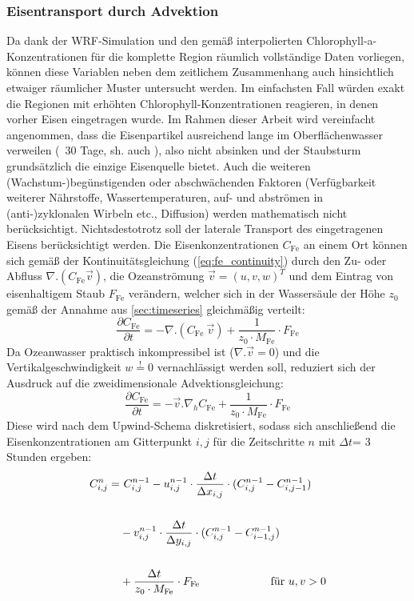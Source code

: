 \documentclass[12pt,a4paper,onecolumn]{scrartcl}
\begin{document}
\subsubsection{Eisentransport durch Advektion} \label{sec:methods_advection}
Da dank der WRF-Simulation und den gemäß \citet{Saulquin.2019} interpolierten Chlorophyll-a-Konzentrationen für die komplette Region räumlich vollständige Daten vorliegen, können diese Variablen neben dem zeitlichem Zusammenhang auch hinsichtlich etwaiger räumlicher Muster untersucht werden. Im einfachsten Fall würden exakt die Regionen mit erhöhten Chlorophyll-Konzentrationen reagieren, in denen vorher Eisen eingetragen wurde. Im Rahmen dieser Arbeit wird vereinfacht angenommen, dass die Eisenpartikel ausreichend lange im Oberflächenwasser verweilen (~30 Tage, sh. auch \citet{Cropp.2013}), also nicht absinken und der Staubsturm grundsätzlich die einzige Eisenquelle bietet. Auch die weiteren (Wachstum-)begünstigenden oder abschwächenden Faktoren (Verfügbarkeit weiterer Nährstoffe, Wassertemperaturen, auf- und abströmen in (anti-)zyklonalen Wirbeln etc., Diffusion) werden mathematisch nicht berücksichtigt. Nichtsdestotrotz soll der laterale Transport des eingetragenen Eisens berücksichtigt werden. Die Eisenkonzentrationen $C_\text{Fe}$ an einem Ort können sich gemäß der Kontinuitätsgleichung (\ref{eq:fe_continuity}) durch den Zu- oder Abfluss $\nabla . (C_\text{Fe} \vec{v})$, die Ozeanströmung $\vec{v} = (u,v,w)^T$  und dem Eintrag von eisenhaltigem Staub $F_\text{Fe}$ verändern, welcher sich in der Wassersäule der Höhe $z_0$ gemäß der Annahme aus \ref{sec:timeseries} gleichmäßig verteilt:
\begin{equation}
\frac{\partial C_\text{Fe}}{\partial t} = - \nabla . (C_\text{Fe} \ \vec{v}) + \frac{1}{z_0 \cdot M_\text{Fe}} \cdot F_\text{Fe} \label{eq:fe_continuity}
\end{equation}
Da Ozeanwasser praktisch inkompressibel ist ($\nabla . \vec{v}=0$) und die Vertikalgeschwindigkeit $w\overset{!}{=}0$ vernachlässigt werden soll, reduziert sich der Ausdruck auf die zweidimensionale Advektionsgleichung:
\begin{equation}
\frac{\partial C_\text{Fe}}{\partial t} = - \vec{v} . \nabla_h  C_\text{Fe}  + \frac{1}{z_0 \cdot M_\text{Fe}} \cdot F_\text{Fe} \label{eq:fe_advection}
\end{equation}
Diese wird nach dem Upwind-Schema diskretisiert, sodass sich anschließend die Eisenkonzentrationen am Gitterpunkt $i,j$ für die Zeitschritte $n$ mit $\Delta t$= 3 Stunden ergeben:
\begin{equation}
\begin{split}
C_{i,j}^n = &\ C_{i,j}^{n-1} - u_{i,j}^{n-1} \cdot \frac{\Delta t}{\Delta x_{i,j}} \cdot (C_{i,j}^{n-1} - C_{i,j-1}^{n-1}) \\\\
&- v_{i,j}^{n-1} \cdot \frac{\Delta t}{\Delta y_{i,j}} \cdot (C_{i,j}^{n-1} - C_{i-1,j}^{n-1})  \\\\
&+ \frac{\Delta t}{z_0 \cdot M_\text{Fe}} \cdot F_\text{Fe} \text{ \qquad  \qquad \qquad für } u,v > 0 \\\\
\end{split}
\end{equation}
\end{document}
